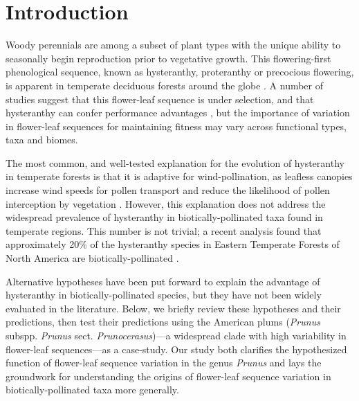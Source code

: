 \documentclass{article}[12pt]
\begin{document}
\section*{Introduction}
\noindent Woody perennials are among a subset of plant types with the unique ability to seasonally begin reproduction prior to vegetative growth. This flowering-first phenological sequence, known as hysteranthy, proteranthy or precocious flowering, is apparent in temperate deciduous forests around the globe \citep{Rathcke_1985}. A number of studies suggest that this flower-leaf sequence is under selection, and that hysteranthy can confer performance advantages \citep{Guo2014,Gougherty2018,Buonaiuto2020}, but the importance of variation in flower-leaf sequences for maintaining fitness may vary across functional types, taxa and biomes. %

\noindent The most common, and well-tested explanation for the evolution of hysteranthy in temperate forests is that it is adaptive for wind-pollination, as leafless canopies increase wind speeds for pollen transport and reduce the likelihood of pollen interception by vegetation \citep{Whitehead1969,Niklas1985}. However, this explanation does not address the widespread prevalence of hysteranthy in biotically-pollinated taxa found in temperate regions. This number is not trivial; a recent analysis found that approximately 20\% of the hysteranthy species in Eastern Temperate Forests of North America are biotically-pollinated \citep{Buonaiuto2020}. 

Alternative hypotheses have been put forward to explain the advantage of hysteranthy in biotically-pollinated species, but they have not been widely evaluated in the literature. Below, we briefly review these hypotheses and their predictions, then test their predictions using the American plums (\textit{Prunus} subspp. \textit{Prunus} sect. \textit{Prunocerasus})---a widespread clade with high variability in flower-leaf sequences---as a case-study. Our study both clarifies the hypothesized function of flower-leaf sequence variation in the genus \emph{Prunus} and lays the groundwork for understanding the origins of flower-leaf sequence variation in biotically-pollinated taxa more generally.
\end{document}

